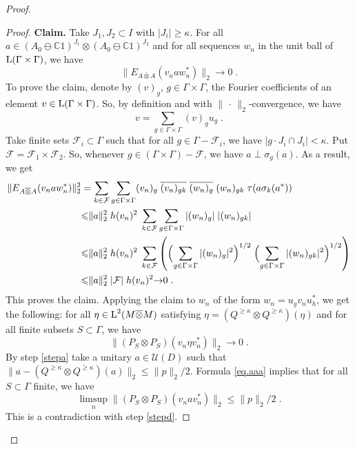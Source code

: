 \documentclass[a4paper,11pt]{amsart}
\numberwithin{equation}{section}
\begin{document}
\begin{proof}
\begin{proof}
{\bf Claim.} Take $J_1,J_2 \subset I$ with $|J_i| {\geqslant} \kappa$. For all $a \in (A_0 \ominus {\mathbb{C}}1)^{J_1} {\otimes} (A_0 \ominus {\mathbb{C}}1)^{J_2}$ and for all sequences $w_n$ in the unit ball of ${\mathord{\text{\rm L}}}(\Gamma \times \Gamma)$, we have
$$\|E_{A {\mathbin{\overline{\otimes}}} A}(v_n a w_n^*)\|_2 {\rightarrow} 0 \; .$$
To prove the claim, denote by $(v)_g$, $g \in \Gamma \times \Gamma$, the Fourier coefficients of an element $v \in {\mathord{\text{\rm L}}}(\Gamma \times \Gamma)$. So, by definition and with $\| \, \cdot \, \|_2$-convergence, we have
$$v = \sum_{g \in \Gamma \times \Gamma} (v)_g u_g \; .$$
Take finite sets ${\mathcal{F}}_i \subset \Gamma$ such that for all $g \in \Gamma - {\mathcal{F}}_i$, we have $|g \cdot J_i \cap J_i| < \kappa$. Put ${\mathcal{F}} = {\mathcal{F}}_1 \times {\mathcal{F}}_2$. So, whenever $g \in (\Gamma \times \Gamma) - {\mathcal{F}}$, we have $a \perp \sigma_g(a)$. As a result, we get
\begin{align*}
\|E_{A {\mathbin{\overline{\otimes}}} A}(v_n a w_n^*)\|_2^2 &= \sum_{k \in {\mathcal{F}}} \sum_{g \in \Gamma \times \Gamma} (v_n)_g \; \overline{(v_n)_{gk}} \; \overline{(w_n)_g} \; (w_n)_{gk} \; \tau(a \sigma_k(a^*)) \\
& {\leqslant} \|a\|_2^2 \; h(v_n)^2 \; \sum_{k \in {\mathcal{F}}} \sum_{g \in \Gamma \times \Gamma} |(w_n)_g| \; |(w_n)_{gk}| \\
& {\leqslant} \|a\|_2^2 \; h(v_n)^2 \; \sum_{k \in {\mathcal{F}}} \left( \Bigl( \sum_{g \in \Gamma \times \Gamma} |(w_n)_g|^2 \Bigr)^{1/2} \; \Bigl( \sum_{g \in \Gamma \times \Gamma} |(w_n)_{gk}|^2 \Bigr)^{1/2}\right) \\
& {\leqslant} \|a\|_2^2 \; |{\mathcal{F}}| \; h(v_n)^2 {\rightarrow} 0 \; .
\end{align*}
This proves the claim. Applying the claim to $w_n$ of the form $w_n = u_g v_n u_h^*$, we get the following:
for all $\eta \in {\mathord{\text{\rm L}}}^2(M {\mathbin{\overline{\otimes}}} M)$ satisfying $\eta = (Q^{{{\scriptscriptstyle\geqslant}} \kappa} {\otimes} Q^{{{\scriptscriptstyle\geqslant}} \kappa})(\eta)$ and for all finite subsets $S \subset \Gamma$, we have
\begin{equation}\label{eq.aaa}
\|(P_S {\otimes} P_S)(v_n \eta v_n^*) \|_2 {\rightarrow} 0 \; .
\end{equation}
By step \ref{stepa} take a unitary $a \in {\mathcal{U}}(D)$ such that $\|a - (Q^{{{\scriptscriptstyle\geqslant}} \kappa} {\otimes} Q^{{{\scriptscriptstyle\geqslant}} \kappa})(a)\|_2 {\leqslant} \|p\|_2/2$. Formula \eqref{eq.aaa} implies that for all $S \subset \Gamma$ finite, we have
$$\limsup_n \|(P_S {\otimes} P_S)(v_n a v_n^*)\|_2 {\leqslant} \|p\|_2/2 \; .$$
This is a contradiction with step \ref{stepd}.
\end{proof}


\end{proof}
\end{document}
